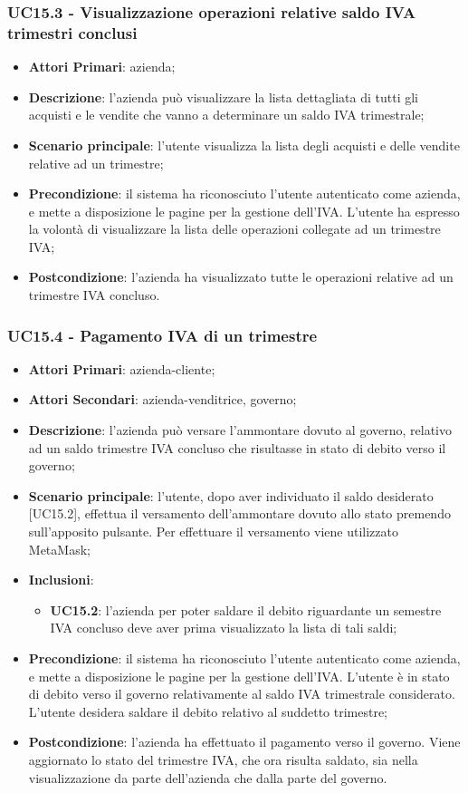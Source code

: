 \subsubsection{UC15.3 - Visualizzazione operazioni relative saldo IVA trimestri conclusi}
\begin{itemize}
	\item \textbf{Attori Primari}: azienda;
	\item \textbf{Descrizione}: l'azienda può visualizzare la lista dettagliata di tutti gli acquisti e le vendite che vanno a determinare un saldo IVA trimestrale;
	\item \textbf{Scenario principale}: l'utente visualizza la lista degli acquisti e delle vendite relative ad un trimestre;
	\item \textbf{Precondizione}: il sistema ha riconosciuto l'utente autenticato come azienda, e mette a disposizione le pagine per la gestione dell'IVA. L'utente ha espresso la volontà di visualizzare la lista delle operazioni collegate ad un trimestre IVA;
	\item \textbf{Postcondizione}: l'azienda ha visualizzato tutte le operazioni relative ad un trimestre IVA concluso.
\end{itemize}
\subsubsection{UC15.4 - Pagamento IVA di un trimestre}
\begin{itemize}
	\item \textbf{Attori Primari}: azienda-cliente;
	\item \textbf{Attori Secondari}: azienda-venditrice, governo;
	\item \textbf{Descrizione}: l'azienda può versare l'ammontare dovuto al governo, relativo ad un saldo trimestre IVA concluso che risultasse in stato di debito verso il governo;
	\item \textbf{Scenario principale}: l'utente, dopo aver individuato il saldo desiderato [UC15.2], effettua il versamento dell'ammontare dovuto allo stato premendo sull'apposito pulsante. Per effettuare il versamento viene utilizzato MetaMask\glo;
	\item \textbf{Inclusioni}:
	\begin{itemize}
		\item \textbf{UC15.2}: l'azienda per poter saldare il debito riguardante un semestre IVA concluso deve aver prima visualizzato la lista di tali saldi;
	\end{itemize}
	\item \textbf{Precondizione}: il sistema ha riconosciuto l'utente autenticato come azienda, e mette a disposizione le pagine per la gestione dell'IVA. L'utente è in stato di debito verso il governo relativamente al saldo IVA trimestrale considerato. L'utente desidera saldare il debito relativo al suddetto trimestre; 
	\item \textbf{Postcondizione}: l'azienda ha effettuato il pagamento verso il governo. Viene aggiornato lo stato del trimestre IVA, che ora risulta saldato, sia nella visualizzazione da parte dell'azienda che dalla parte del governo.
\end{itemize} 
